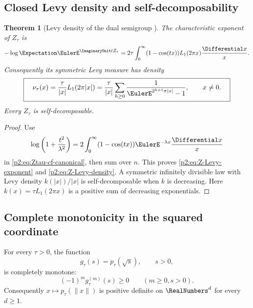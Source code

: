 \documentclass[11pt]{article}
\newtheorem{theorem}{Theorem}[section]
\theoremstyle{definition}
\theoremstyle{remark}
\begin{document}
\subsection{Closed Levy density and self-decomposability}

\begin{theorem}[Levy density of the dual semigroup \New]
The characteristic exponent of $Z_\tau$ is
\begin{equation}
 -\log\Expectation\EulerE^{\ImaginaryUnit tZ_\tau}
 =2\tau\int_0^\infty(1-\cos(tx))L_1(2\pi x)\frac{\Differential x}{x}.  \label{p2:eq:Z-Levy-exponent}
\end{equation}
Consequently its symmetric Levy measure has density
\begin{equation}
 \boxed{\quad
 \nu_\tau(x)=\frac{\tau}{|x|}L_1(2\pi|x|)
 =\frac{\tau}{|x|}\sum_{h\ge0}
   \frac{1}{\EulerE^{2^{h+1}\pi|x|}-1},
 \qquad x\ne0.
 \quad}                                                  \label{p2:eq:Z-Levy-density}
\end{equation}
Every $Z_\tau$ is self-decomposable.
\end{theorem}

\begin{proof}
Use
\[
 \log\left(1+\frac{t^2}{\lambda^2}\right)
 =2\int_0^\infty(1-\cos(tx))\EulerE^{-\lambda x}\frac{\Differential x}{x}
\]
in \eqref{p2:eq:Ztau-cf-canonical}, then sum over $n$.  This proves
\eqref{p2:eq:Z-Levy-exponent} and \eqref{p2:eq:Z-Levy-density}.  A symmetric infinitely divisible
law with Levy density $k(|x|)/|x|$ is self-decomposable when $k$ is decreasing.  Here
$k(x)=\tau L_1(2\pi x)$ is a positive sum of decreasing exponentials.
\end{proof}

\subsection{Complete monotonicity in the squared coordinate}

\begin{corollary}
For every $\tau>0$, the function
\begin{equation}
 g_\tau(s)=p_\tau(\sqrt s),\qquad s>0,                    \label{p2:eq:g-density}
\end{equation}
is completely monotone:
\begin{equation}
 (-1)^m g_\tau^{(m)}(s)\ge0\qquad(m\ge0,s>0).            \label{p2:eq:CM-density}
\end{equation}
Consequently $x\mapsto p_\tau(\|x\|)$ is positive definite on $\RealNumbers^d$ for every
$d\ge1$.
\end{corollary}
\end{document}
